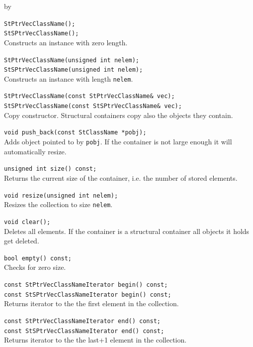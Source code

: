 \documentclass[twoside]{article}
\newcommand{\entrylabel}[1]{\mbox{\textbf{{#1}}}\hfil}%
\newenvironment{entry}
{\begin{list}{}%
    {\renewcommand{\makelabel}{\entrylabel}%
     \setlength{\labelwidth}{90pt}%
     \setlength{\leftmargin}{\labelwidth}
     \advance\leftmargin by \labelsep%
      }%
    }%
  {\end{list}}
\newcommand{\Entrylabel}[1]%
{\raisebox{0pt}[1ex][0pt]{\makebox[\labelwidth][l]%
    {\parbox[t]{\labelwidth}{\hspace{0pt}\textbf{{#1}}}}}}
\newenvironment{Entry}%
{\renewcommand{\entrylabel}{\Entrylabel}\begin{entry}}%
  {\end{entry}}
\begin{document}
\begin{Entry}
\item[Public\\ Constructors]
    \verb+StPtrVecClassName();+\\
    \verb+StSPtrVecClassName();+\\
    Constructs an instance with zero length.

    \verb+StPtrVecClassName(unsigned int nelem);+\\
    \verb+StSPtrVecClassName(unsigned int nelem);+\\
    Constructs an instance with length \texttt{nelem}.
    
    \verb+StPtrVecClassName(const StPtrVecClassName& vec);+\\
    \verb+StSPtrVecClassName(const StSPtrVecClassName& vec);+\\
    Copy constructor. Structural containers copy also the objects they
    contain.
    
\item[Public Member\\ Functions]
    \verb+void push_back(const StClassName *pobj);+\\
    Adds object pointed to by \texttt{pobj}. If the container is not
    large enough it will automatically resize.

    \verb+unsigned int size() const;+\\
    Returns the current size of the container, i.e. the number of
    stored elements.
    
    \verb+void resize(unsigned int nelem);+\\
    Resizes the collection to size \texttt{nelem}.

    \verb+void clear();+\\
    Deletes all elements. If the container is a structural container
    all objects it holds get deleted.
    
    \verb+bool empty() const;+\\
    Checks for zero size.
    
    \verb+const StPtrVecClassNameIterator begin() const;+\\
    \verb+const StSPtrVecClassNameIterator begin() const;+\\
    Returns iterator to the the first element in the collection.
    
    \verb+const StPtrVecClassNameIterator end() const;+\\
    \verb+const StSPtrVecClassNameIterator end() const;+\\
    Returns iterator to the the last+1 element in the collection.
    

\end{Entry}
\end{document}
